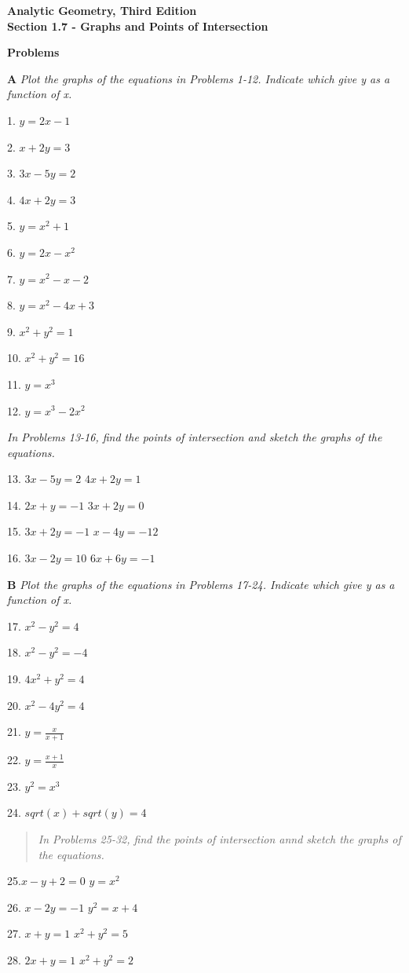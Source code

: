 \documentclass[10pt,letterpaper]{article}
\begin{document}
\textbf{Analytic Geometry, Third Edition}\\

\textbf{Section 1.7 - Graphs and Points of Intersection}

\textbf{Problems}

\textbf{A} \textit{Plot the graphs of the equations in Problems 1-12. Indicate which give y as a function of x.}

1. $y=2x-1$

2. $x+2y=3$

3. $3x-5y=2$

4. $4x+2y=3$

5. $y=x^2+1$

6. $y=2x-x^2$

7. $y=x^2-x-2$

8. $y=x^2-4x +3$

9. $x^2+y^2=1$

10. $x^2+y^2=16$

11. $y=x^3$

12. $y=x^3-2x^2$

\textit{In Problems 13-16, find the points of intersection and sketch the graphs of the equations.}

13. $3x-5y=2$
$4x+2y=1$

14. $2x+y=-1$
$3x+2y=0$

15. $3x+2y=-1$
$x-4y=-12$

16. $3x-2y=10$
$6x+6y=-1$

\textbf{B} \textit{Plot the graphs of the equations in Problems 17-24. Indicate which give y as a function of x.}

17. $x^2-y^2=4$

18. $x^2-y^2=-4$

19. $4x^2+y^2=4$

20. $x^2-4y^2 =4$

21. $y=\frac{x}{x+1}$

22. $y=\frac{x+1}{x}$

23. $y^2=x^3$

24. $sqrt(x)+sqrt(y)=4$

\begin{quote}
\textit{In Problems 25-32, find the points of intersection annd sketch the graphs of the equations.}
\end{quote}

25.$x-y+2=0$
$y=x^2$

26.
$x- 2y=-1$
$y^2=x+ 4$

27.
$x+ y=1$
$x^2+y^2=5$

28.
$2x+ y=1$
$x^2+y^2=2$
\end{document}
